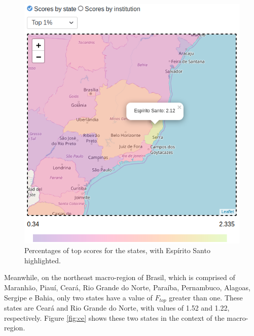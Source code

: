 \documentclass{vgtc}                          %
\begin{document}
\begin{figure}
	\centering
	\includegraphics[width=\columnwidth]{figures/es_top.png}
	\caption{Percentages of top scores for the states, with Espírito Santo highlighted.}
	\label{fig:estop}
\end{figure}

Meanwhile, on the northeast macro-region of Brasil, which is comprised of Maranhão, Piauí, Ceará, Rio Grande do Norte, Paraíba, Pernambuco, Alagoas, Sergipe e Bahia, only two states have a value of $F_{top}$ greater than one. These states are Ceará and Rio Grande do Norte, with values of 1.52 and 1.22, respectively. Figure \ref{fig:ce} shows these two states in the context of the macro-region.
\end{document}
